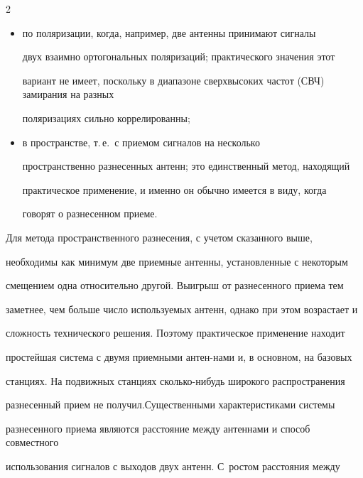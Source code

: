 \begin{multicols}{2}
\begin{itemize}
(интенсивность принимаемого сигнала), по крайней мере, для всех антенн, 


кроме одной;\\[-15pt]


\item по поляризации, когда, например, две антенны принимают сигналы 


двух взаимно ортогональных поляризаций; практического значения этот 


вариант не имеет, поскольку в диапазоне сверхвысоких час\-тот (СВЧ) замирания на разных 


поляризациях сильно коррелированны;\\[-15pt]


\item в пространстве, т.\,е.\ с приемом сигналов на несколько 


пространственно разнесенных антенн; это единственный метод, находящий 


практическое применение, и именно он обычно имеется в виду, когда 


говорят о разнесенном приеме.


\end{itemize}


     


     Для метода пространственного разнесения, с учетом сказанного выше, 


необходимы как минимум две приемные антенны, установленные с некоторым 


смещением одна относительно другой. Выигрыш от разнесенного приема тем 


заметнее, чем больше число используемых антенн, однако при этом возрастает и 


сложность технического решения. Поэтому практическое применение находит\linebreak 


простейшая система с двумя приемными антен-\linebreak нами и, в основном, на базовых 


станциях. На по\-движ\-ных станциях сколько-нибудь широкого распространения 


разнесенный прием не получил.\linebreak Существенными характеристиками системы 


разнесенного приема являются расстояние между антеннами и способ совместного 


использования сигналов с выходов двух антенн. С~ростом расстояния между 



\end{multicols}

